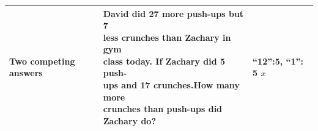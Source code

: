 \begin{table}[h]
\begin{tabular}{|l|l|l|}
\midrule
Two competing answers & \makecell[l]{David did 27 more push-ups but 7 \\ less crunches than Zachary in gym \\class today. If Zachary did 5 push-\\ups and 17 crunches.How many more\\ crunches than push-ups did Zachary do?	} & ``\textbf{12}'':5, ``1'': 5 $x$ \\
\bottomrule
\end{tabular}
\label{tab:error_types_math}
\end{table}